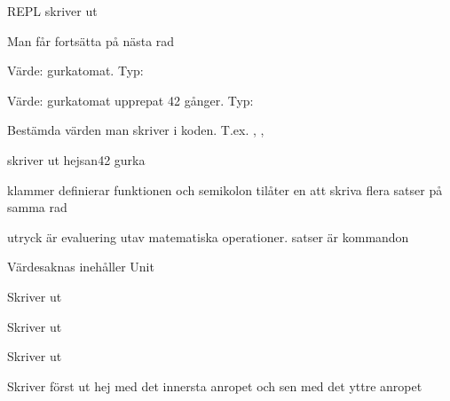 
\ExerciseSolution{\ExeWeekONE}

\BasicTasks %

\Task %

\Subtask REPL skriver ut 

\Subtask Man får fortsätta på nästa rad

\Subtask Värde: gurkatomat. Typ:  

\Subtask Värde: gurkatomat upprepat 42 gånger. Typ: 

\Task %

Bestämda värden man skriver i koden. T.ex.  ,  ,  
 
\Task %

\Subtask  {}

\Subtask  {}

\Subtask  {}

\Subtask  {}

\Subtask  {}

\Subtask  {}

\Subtask  {}

\Subtask  {}

\Subtask  {}

\Subtask  {}

\Subtask  {}


\Task %
 skriver ut 
hejsan42
gurka

 klammer definierar funktionen och semikolon tilåter en att skriva flera satser på samma rad

\Task %
\Subtask  utryck är evaluering utav matematiska operationer. satser är kommandon

\Subtask {}

\Subtask 

 Värdesaknas inehåller Unit

 Skriver ut 

 Skriver ut 

 Skriver ut 

 Skriver först ut hej med det innersta anropet och sen \code{()} med det yttre anropet

\Subtask  {}

\Subtask  {}

